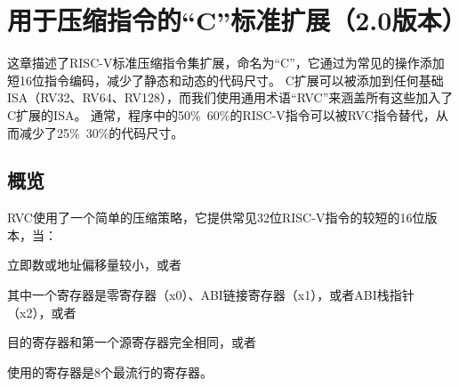 \chapter{用于压缩指令的“C”标准扩展（2.0版本）}
\label{compressed}

这章描述了RISC-V标准压缩指令集扩展，命名为“C”，它通过为常见的操作添加短16位指令编码，减少了静态和动态的代码尺寸。
C扩展可以被添加到任何基础ISA（RV32、RV64、RV128），而我们使用通用术语“RVC”来涵盖所有这些加入了C扩展的ISA。
通常，程序中的50\%~60\%的RISC-V指令可以被RVC指令替代，从而减少了25\%~30\%的代码尺寸。

\section{概览}

RVC使用了一个简单的压缩策略，它提供常见32位RISC-V指令的较短的16位版本，当：
\begin{tightlist}
	\item 立即数或地址偏移量较小，或者  %
	\item 其中一个寄存器是零寄存器（x0）、ABI链接寄存器（x1），或者ABI栈指针（x2），或者
	\item 目的寄存器和第一个源寄存器完全相同，或者 
	\item 使用的寄存器是8个最流行的寄存器。%
\end{tightlist}

